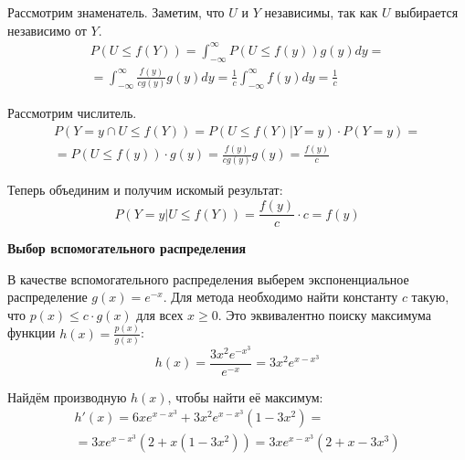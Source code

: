 \documentclass[a4paper,14pt]{extarticle}
\begin{document}
                    Рассмотрим знаменатель. Заметим, что $U$ и $Y$ независимы, так как $U$ выбирается независимо от $Y$.
                    \begin{gather*}
                            P(U \leq f(Y)) =
                            \int_{-\infty}^{\infty} P(U \leq f(y)) g(y) dy =\\
                            = \int_{-\infty}^{\infty} \frac{f(y)}{cg(y)} g(y) dy =
                            \frac{1}{c} \int_{-\infty}^{\infty} f(y) dy =
                            \frac{1}{c}
                    \end{gather*}
                    
                    Рассмотрим числитель.
                    \begin{gather*}
                            P(Y = y \cap U\le f(Y)) = P(U\le f(Y) | Y = y) \cdot P (Y = y) =\\
                            = P(U\le f(y)) \cdot g(y) =
                            \frac{f(y)}{cg(y)}g(y) = \frac{f(y)}{c}
                    \end{gather*}
                    
                    Теперь объединим и получим искомый результат:
                    \[
                    P(Y=y|U\le f(Y)) =
                    \frac{f(y)}{c}\cdot c = f(y)
                    \]
                    
                    \textbf{Выбор вспомогательного распределения}
                    
                    В качестве вспомогательного распределения выберем экспоненциальное распределение $g(x) = e^{-x}$.
                    Для метода необходимо найти константу $c$ такую, что $p(x) \leq c \cdot g(x)$ для всех $x \geq 0$.
                    Это эквивалентно поиску максимума функции $h(x) = \frac{p(x)}{g(x)}$:
                    \[
                    h(x) = \frac{3x^2 e^{-x^3}}{e^{-x}} = 3x^2 e^{x - x^3}
                    \]
                    
                    Найдём производную $h(x)$, чтобы найти её максимум:
                    \begin{gather*}
                            h'(x) = 6x e^{x - x^3} + 3x^2 e^{x - x^3} (1 - 3x^2) = \\
                            = 3x e^{x - x^3} (2 + x(1 - 3x^2)) = 3x e^{x - x^3} (2 + x - 3x^3)
                    \end{gather*}
                    
\end{document}

